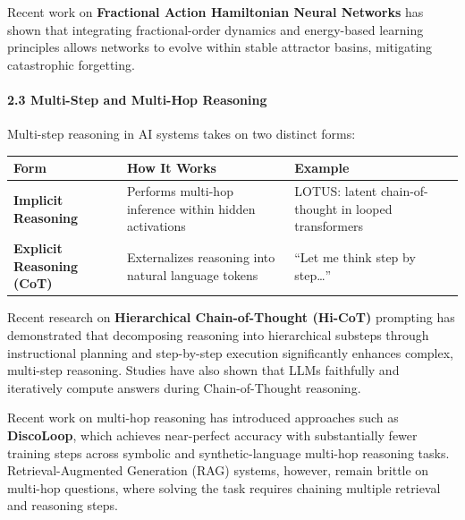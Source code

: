 \documentclass[
  11pt,
  a4paper,
]{article}
\begin{document}
Recent work on \textbf{Fractional Action Hamiltonian Neural Networks}
has shown that integrating fractional-order dynamics and energy-based
learning principles allows networks to evolve within stable attractor
basins, mitigating catastrophic forgetting.

\paragraph{2.3 Multi-Step and Multi-Hop
Reasoning}\label{multi-step-and-multi-hop-reasoning}

Multi-step reasoning in AI systems takes on two distinct forms:

\begin{longtable}[]{@{}
  >{\raggedright\arraybackslash}p{}
  >{\raggedright\arraybackslash}p{}
  >{\raggedright\arraybackslash}p{}@{}}
\toprule\noalign{}
\begin{minipage}[b]{\linewidth}\raggedright
Form
\end{minipage} & \begin{minipage}[b]{\linewidth}\raggedright
How It Works
\end{minipage} & \begin{minipage}[b]{\linewidth}\raggedright
Example
\end{minipage} \\
\midrule\noalign{}
\endhead
\bottomrule\noalign{}
\endlastfoot
\textbf{Implicit Reasoning} & Performs multi-hop inference within hidden
activations & LOTUS: latent chain-of-thought in looped transformers \\
\textbf{Explicit Reasoning (CoT)} & Externalizes reasoning into natural
language tokens & ``Let me think step by step\ldots{}'' \\
\end{longtable}

Recent research on \textbf{Hierarchical Chain-of-Thought (Hi-CoT)}
prompting has demonstrated that decomposing reasoning into hierarchical
substeps through instructional planning and step-by-step execution
significantly enhances complex, multi-step reasoning. Studies have also
shown that LLMs faithfully and iteratively compute answers during
Chain-of-Thought reasoning.

Recent work on multi-hop reasoning has introduced approaches such as
\textbf{DiscoLoop}, which achieves near-perfect accuracy with
substantially fewer training steps across symbolic and
synthetic-language multi-hop reasoning tasks. Retrieval-Augmented
Generation (RAG) systems, however, remain brittle on multi-hop
questions, where solving the task requires chaining multiple retrieval
and reasoning steps.
\end{document}
